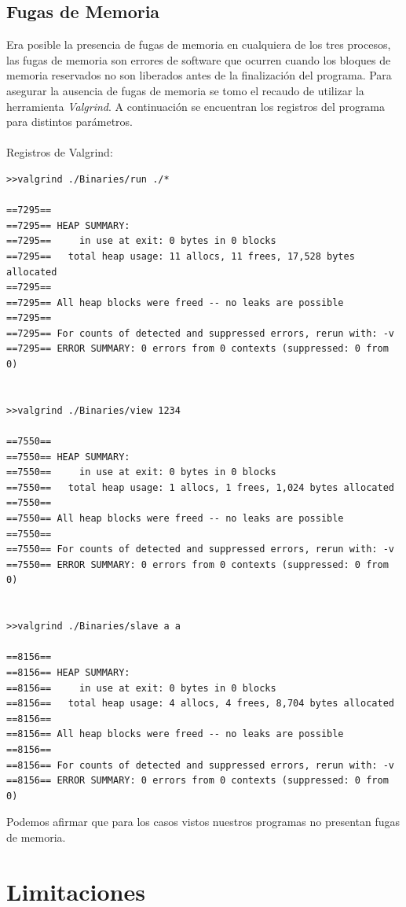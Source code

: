 \documentclass[10pt,a4paper]{report}
\begin{document}
\section{Fugas de Memoria}
Era posible la presencia de fugas de memoria en cualquiera de los tres procesos, las fugas de memoria
son errores de software que ocurren cuando los bloques de memoria reservados no son liberados antes de la finalización del programa.
Para asegurar la ausencia de fugas de memoria se tomo el recaudo de utilizar la herramienta \textit{Valgrind}. A continuación se encuentran
los registros del programa para distintos parámetros.
\\\\ Registros de Valgrind:
\begin{lstlisting}
>>valgrind ./Binaries/run ./*

==7295==
==7295== HEAP SUMMARY:
==7295==     in use at exit: 0 bytes in 0 blocks
==7295==   total heap usage: 11 allocs, 11 frees, 17,528 bytes allocated
==7295==
==7295== All heap blocks were freed -- no leaks are possible
==7295==
==7295== For counts of detected and suppressed errors, rerun with: -v
==7295== ERROR SUMMARY: 0 errors from 0 contexts (suppressed: 0 from 0)


>>valgrind ./Binaries/view 1234

==7550==
==7550== HEAP SUMMARY:
==7550==     in use at exit: 0 bytes in 0 blocks
==7550==   total heap usage: 1 allocs, 1 frees, 1,024 bytes allocated
==7550==
==7550== All heap blocks were freed -- no leaks are possible
==7550==
==7550== For counts of detected and suppressed errors, rerun with: -v
==7550== ERROR SUMMARY: 0 errors from 0 contexts (suppressed: 0 from 0)


>>valgrind ./Binaries/slave a a

==8156==
==8156== HEAP SUMMARY:
==8156==     in use at exit: 0 bytes in 0 blocks
==8156==   total heap usage: 4 allocs, 4 frees, 8,704 bytes allocated
==8156==
==8156== All heap blocks were freed -- no leaks are possible
==8156==
==8156== For counts of detected and suppressed errors, rerun with: -v
==8156== ERROR SUMMARY: 0 errors from 0 contexts (suppressed: 0 from 0)

\end{lstlisting}
Podemos afirmar que para los casos vistos nuestros programas no presentan fugas de memoria.


\chapter{Limitaciones}
\end{document}
